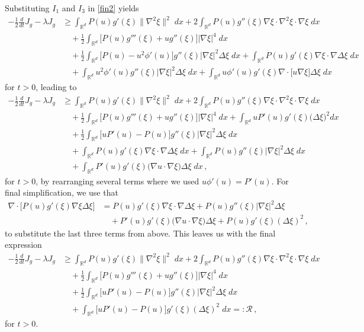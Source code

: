 \documentclass[reqno]{amsart}
\newcommand{\R}{\mathbb{R}}
\begin{document}
Substituting $I_1$ and $I_3$ in \eqref{fin2} yields 
\begin{align*}
  -\frac12\frac{d}{dt}J_g -\lambda J_g
  &\ge \int_{\R^d} P(u)g'(\xi)\|\nabla^2\xi\|^2 \;dx+ 2 \int_{\R^d} P(u)g''(\xi)\nabla\xi\cdot\nabla^2\xi\cdot\nabla\xi \;dx\\
  &\quad+ \frac12\int_{\R^d}\big[P(u)g'''(\xi)+ug''(\xi)\big]|\nabla\xi|^4\;dx\\
  &\quad + \frac12\int_{\R^d} \big[P(u)-u^2\phi'(u)\big]g''(\xi)|\nabla\xi|^2\Delta\xi \;dx+ \int_{\R^d} P(u)g'(\xi)\nabla\xi\cdot\nabla\Delta\xi \;dx\\
  &\quad + \int_{\R^d} u^2\phi'(u)g''(\xi)|\nabla\xi|^2\Delta\xi\;dx
  + \int_{\R^d} u\phi'(u)g'(\xi)\nabla\cdot\big[u\nabla\xi\big]\Delta\xi\;dx
\end{align*}
for $t>0$, leading to
\begin{align*}
  -\frac12\frac{d}{dt}J_g -\lambda J_g
  &\ge \int_{\R^d} P(u)g'(\xi)\|\nabla^2\xi\|^2 \;dx+ 2 \int_{\R^d} P(u)g''(\xi)\nabla\xi\cdot\nabla^2\xi\cdot\nabla\xi \;dx\\
  &\quad + \frac12\int_{\R^d}\big[P(u)g'''(\xi)+ug''(\xi)\big]|\nabla\xi|^4 \;dx+\! \int_{\R^d} uP'(u)g'(\xi)\big(\Delta\xi\big)^2dx\\
  &\quad + \frac12 \int_{\R^d} \big[uP'(u)-P(u)\big]g''(\xi)|\nabla\xi|^2\Delta\xi \;dx\\
  &\quad + \int_{\R^d} P(u)g'(\xi)\nabla\xi\cdot\nabla\Delta\xi \;dx+ \int_{\R^d} P(u) g''(\xi)|\nabla\xi|^2\Delta\xi\;dx\\
  &\quad 
  + \int_{\R^d} P'(u)g'(\xi)\big(\nabla u\cdot \nabla\xi\big)\Delta\xi \;dx\,,
\end{align*}
for $t>0$, by rearranging several terms where we used $u\phi'(u)=P'(u)$.
For final simplification, we use that
\begin{align*}
  \nabla\cdot\big[P(u)g'(\xi)\nabla\xi\Delta\xi\big] &= P(u)g'(\xi)\nabla\xi\cdot\nabla\Delta\xi
  + P(u)g''(\xi)|\nabla\xi|^2\Delta\xi\\
  & \quad
  + P'(u)g'(\xi)\big(\nabla u\cdot\nabla\xi\big)\Delta\xi + P(u)g'(\xi)(\Delta\xi)^2\,,
\end{align*}
to substitute the last three terms from above. This leaves us with the final expression
\begin{align}
  -\frac12\frac{d}{dt}J_g - \lambda J_g
  &\ge 
\int_{\R^d} P(u)g'(\xi)\|\nabla^2\xi\|^2 \;dx+ 2 \int_{\R^d} P(u)g''(\xi)\nabla\xi\cdot\nabla^2\xi\cdot\nabla\xi \;dx\nonumber\\
  &\quad + \frac12\int_{\R^d} \big[P(u)g'''(\xi)+ug''(\xi)\big]|\nabla\xi|^4 \;dx\nonumber\\
  &\quad + \frac12\int_{\R^d} \big[uP'(u)-P(u)\big]g''(\xi)|\nabla\xi|^2\Delta\xi \;dx\nonumber\\
  &\quad + \int_{\R^d} \big[uP'(u)-P(u)\big]g'(\xi)(\Delta\xi)^2 \;dx=: \mathcal{R}\,,
  \label{jjj}
\end{align}
for $t>0$. 
\end{document}
